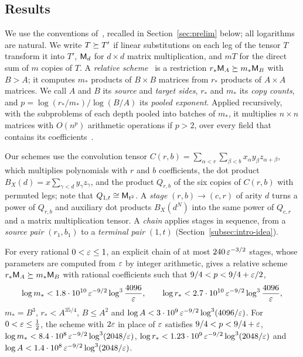 \subsection{Results}
\label{subsec:intro-results}

We use the conventions of~\citep{FinCon26}, recalled in
Section~\ref{sec:prelim} below; all logarithms are natural. We write
\(T\succeq T'\) if linear substitutions on each leg of the tensor \(T\) transform it into \(T'\),
\(\mathsf M_d\) for \(d\times d\) matrix multiplication, and \(mT\) for the
direct sum of \(m\) copies of \(T\). A \emph{relative
scheme}~\citep[Definition~2.3]{FinCon26} is a restriction
\(r_*\mathsf M_A\succeq m_*\mathsf M_B\) with \(B>A\); it computes \(m_*\) products
of \(B\times B\) matrices from \(r_*\) products of \(A\times A\)
matrices. We call \(A\) and \(B\) its \emph{source} and \emph{target
sides}, \(r_*\) and \(m_*\) its \emph{copy counts}, and
\(p=\log(r_*/m_*)/\log(B/A)\) its \emph{pooled exponent}. Applied
recursively, with the subproblems of each depth pooled into batches of
\(m_*\), it multiplies \(n\times n\) matrices with \(O(n^p)\) arithmetic
operations if \(p>2\), over every field that contains its
coefficients~\citep[Lemma~2.4]{FinCon26}.

Our schemes use the convolution tensor
\(C(r,b)=\sum_{\alpha<r}\sum_{\beta<b}x_\alpha y_\beta z_{\alpha+\beta}\),
which multiplies polynomials with \(r\) and \(b\) coefficients, the dot
product \(B_X(d)=x\sum_{\gamma<d}y_\gamma z_\gamma\), and the product
\(Q_{r,b}\) of the six copies of \(C(r,b)\) with permuted legs; note that
\(Q_{1,t}\cong\mathsf M_{t^2}\). A \emph{stage} \((r,b)\to(c,r)\) of arity
\(d\) turns a power of \(Q_{r,b}\) and auxiliary dot products
\(B_X(d^N)\) into the same power of \(Q_{c,r}\) and a matrix
multiplication tensor. A \emph{chain} applies stages in sequence, from a
\emph{source pair} \((r_1,b_1)\) to a \emph{terminal pair} \((1,t)\)
(Section~\ref{subsec:intro-idea}).
\begin{theorem}\label{thm:intro-main}
For every rational \(0<\varepsilon\le1\), an explicit chain of at most
\(240\,\varepsilon^{-3/2}\) stages, whose parameters are computed from \(\varepsilon\)
by integer arithmetic, gives a relative scheme
\(r_*\mathsf M_A\succeq m_*\mathsf M_B\) with rational coefficients such that
\(9/4<p<9/4+\varepsilon/2\),
\[
 \log m_*<1.8\cdot10^{10}\,\varepsilon^{-9/2}\log^3\frac{4096}{\varepsilon},\qquad
 \log r_*<2.7\cdot10^{10}\,\varepsilon^{-9/2}\log^3\frac{4096}{\varepsilon},
\]
\(m_*=B^3\), \(r_*<A^{35/4}\), \(B\le A^2\) and
\(\log A<3\cdot10^9\,\varepsilon^{-9/2}\log^3(4096/\varepsilon)\). For
\(0<\varepsilon\le\frac12\), the scheme with \(2\varepsilon\) in place of \(\varepsilon\)
satisfies \(9/4<p<9/4+\varepsilon\),
\(\log m_*<8.4\cdot10^8\,\varepsilon^{-9/2}\log^3(2048/\varepsilon)\),
\(\log r_*<1.23\cdot10^9\,\varepsilon^{-9/2}\log^3(2048/\varepsilon)\) and
\(\log A<1.4\cdot10^8\,\varepsilon^{-9/2}\log^3(2048/\varepsilon)\).
\end{theorem}

